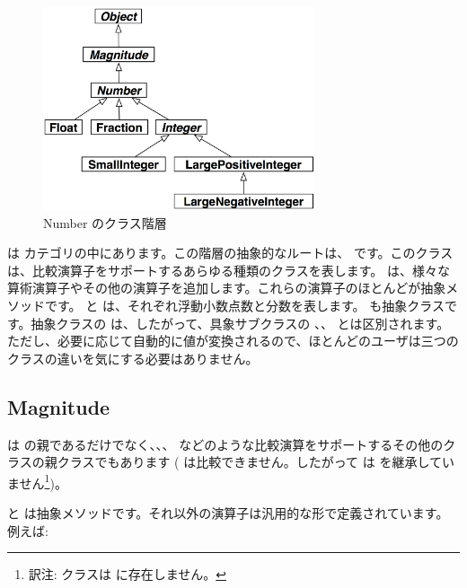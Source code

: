 \documentclass[a4paper,10pt,twoside]{book}
\begin{document}
\begin{figure}[ht]
\centerline {\includegraphics[width=8cm]{NumberHierarchy}}
\caption{Number のクラス階層 }
\end{figure}

 は  カテゴリの中にあります。この階層の抽象的なルートは、 です。このクラスは、比較演算子をサポートするあらゆる種類のクラスを表します。 は、様々な算術演算子やその他の演算子を追加します。これらの演算子のほとんどが抽象メソッドです。 と  は、それぞれ浮動小数点数と分数を表します。 も抽象クラスです。抽象クラスの  は、したがって、具象サブクラスの 、、 とは区別されます。ただし、必要に応じて自動的に値が変換されるので、ほとんどのユーザは三つの  クラスの違いを気にする必要はありません。%

\subsection{Magnitude}

 は  の親であるだけでなく、、、 などのような比較演算をサポートするその他のクラスの親クラスでもあります ( は比較できません。したがって  は  を継承していません\footnote{訳注:  クラスは  に存在しません。})。

 と  は抽象メソッドです。それ以外の演算子は汎用的な形で定義されています。例えば:
\end{document}
